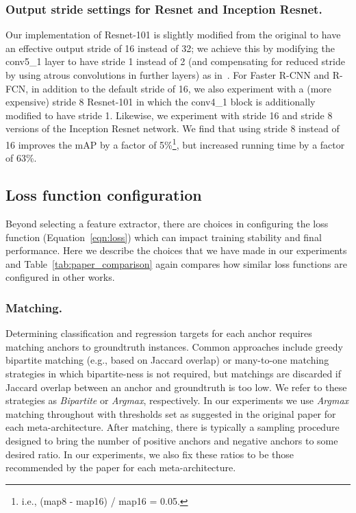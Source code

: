 \documentclass[10pt,twocolumn,letterpaper]{article}
\renewcommand{\paragraph}[1]{\subsubsection{#1}}
\begin{document}
\paragraph{Output stride settings for Resnet and Inception Resnet.}
Our implementation of Resnet-101 is slightly modified from the
original to have an
effective output stride of 16 instead of 32;
we achieve this by modifying the conv5\_1
layer to have stride 1 instead of  2 (and compensating for reduced
stride by using atrous convolutions in further layers) as
in~\cite{dai2016r}.  For Faster R-CNN and R-FCN, in addition to the
default stride of 16, we also experiment with a (more expensive)
stride 8 Resnet-101 in which the conv4\_1 block is additionally
modified to have stride 1.  Likewise, we experiment with stride 16 and
stride 8 versions of the Inception Resnet network.
We find that using stride 8 instead of 16
improves the mAP by a factor of 5\%\footnote{
i.e., (map8 - map16) / map16 = 0.05.
  },
but increased running time by a factor of 63\%.





\subsection{Loss function configuration}
Beyond selecting a feature extractor, there are choices in configuring the loss function (Equation~\ref{eqn:loss}) which can impact training stability and final performance. Here we describe the choices that we have made in our experiments and Table~\ref{tab:paper_comparison} again compares how similar loss functions are configured in other works.

\paragraph{Matching.} 
Determining classification and regression targets for 
each anchor requires matching anchors to groundtruth instances.  Common approaches include greedy bipartite matching (e.g., based on Jaccard overlap) or  many-to-one matching strategies in which bipartite-ness is not required, but matchings are discarded if Jaccard overlap between an anchor and groundtruth is too low.  We refer to these strategies as \emph{Bipartite}
or \emph{Argmax}, respectively.  In our experiments we use \emph{Argmax} matching throughout with thresholds set as suggested in the original paper for each meta-architecture. After matching, there is typically a sampling procedure designed to bring the number of positive anchors and negative anchors to some desired ratio.  In our experiments, we also fix these ratios to be those recommended by the paper for each meta-architecture.
\end{document}
